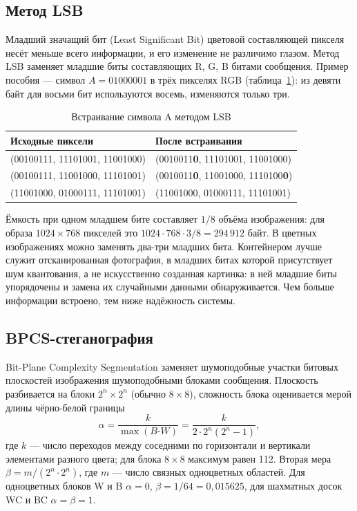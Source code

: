 \documentclass[14pt,a4paper]{extarticle}
\begin{document}
\subsection{Метод LSB}

Младший значащий бит (Least Significant Bit) цветовой составляющей пикселя несёт
меньше всего информации, и его изменение не различимо глазом. Метод LSB заменяет
младшие биты составляющих R, G, B битами сообщения. Пример пособия --- символ
$A = 01000001$ в трёх пикселях RGB (таблица~\ref{tab:lsb}): из девяти байт для восьми
бит используются восемь, изменяются только три.

\begin{table}[H]
\caption{Встраивание символа A методом LSB}
\label{tab:lsb}
\centering
\begin{tabular}{ll}
\toprule
Исходные пиксели & После встраивания \\
\midrule
(00100111, 11101001, 11001000) & (0010011\textbf{0}, 11101001, 11001000) \\
(00100111, 11001000, 11101001) & (0010011\textbf{0}, 11001000, 1110100\textbf{0}) \\
(11001000, 01000111, 11101001) & (11001000, 01000111, 11101001) \\
\bottomrule
\end{tabular}
\end{table}

Ёмкость при одном младшем бите составляет $1/8$ объёма изображения: для образа
$1024 \times 768$ пикселей это $1024 \cdot 768 \cdot 3 / 8 = 294\,912$ байт. В цветных
изображениях можно заменять два-три младших бита. Контейнером лучше служит
отсканированная фотография, в младших битах которой присутствует шум квантования, а не
искусственно созданная картинка: в ней младшие биты упорядочены и замена их случайными
данными обнаруживается. Чем больше информации встроено, тем ниже надёжность системы.

\subsection{BPCS-стеганография}

Bit-Plane Complexity Segmentation заменяет шумоподобные участки битовых плоскостей
изображения шумоподобными блоками сообщения. Плоскость разбивается на блоки
$2^n \times 2^n$ (обычно $8 \times 8$), сложность блока оценивается мерой длины
чёрно-белой границы
\begin{equation}
\alpha = \frac{k}{\max(B\text{-}W)} = \frac{k}{2 \cdot 2^n (2^n - 1)},
\end{equation}
где $k$ --- число переходов между соседними по горизонтали и вертикали элементами
разного цвета; для блока $8 \times 8$ максимум равен 112. Вторая мера $\beta = m /
(2^n \cdot 2^n)$, где $m$ --- число связных одноцветных областей. Для одноцветных
блоков W и B $\alpha = 0$, $\beta = 1/64 = 0{,}015625$, для шахматных досок WC и BC
$\alpha = \beta = 1$.
\end{document}
